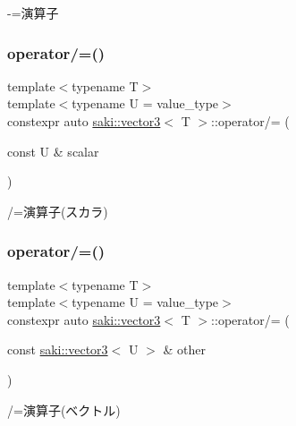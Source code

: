 -\/=演算子 

\mbox{\label{classsaki_1_1vector3_aada96ea6099dc050f89bc0fead1706ca}} 
\subsubsection{\texorpdfstring{operator/=()}{operator/=()}\hspace{0.1cm}{\footnotesize\ttfamily [1/2]}}
{\footnotesize\ttfamily template$<$typename T$>$ \\
template$<$typename U  = value\+\_\+type$>$ \\
constexpr auto \mbox{\hyperlink{classsaki_1_1vector3}{saki\+::vector3}}$<$ T $>$\+::operator/= (\begin{DoxyParamCaption}\item[{const U \&}]{scalar }\end{DoxyParamCaption})\hspace{0.3cm}{\ttfamily [inline]}}



/=演算子(スカラ) 

\mbox{\label{classsaki_1_1vector3_ad50fe15d3b66f8c90775b595ee0c7472}} 
\subsubsection{\texorpdfstring{operator/=()}{operator/=()}\hspace{0.1cm}{\footnotesize\ttfamily [2/2]}}
{\footnotesize\ttfamily template$<$typename T$>$ \\
template$<$typename U  = value\+\_\+type$>$ \\
constexpr auto \mbox{\hyperlink{classsaki_1_1vector3}{saki\+::vector3}}$<$ T $>$\+::operator/= (\begin{DoxyParamCaption}\item[{const \mbox{\hyperlink{classsaki_1_1vector3}{saki\+::vector3}}$<$ U $>$ \&}]{other }\end{DoxyParamCaption})\hspace{0.3cm}{\ttfamily [inline]}}



/=演算子(ベクトル) 

